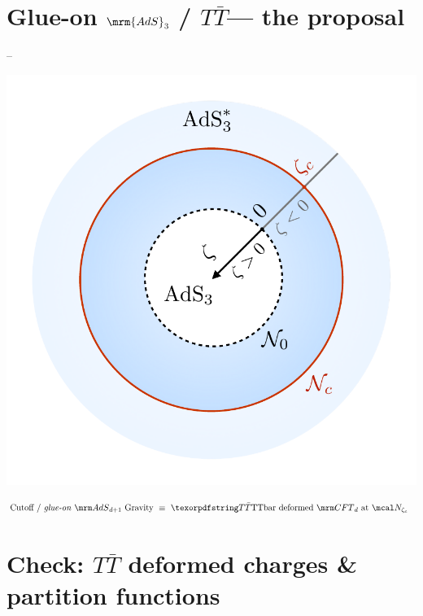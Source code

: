 \documentclass[10pt]{article}
\renewenvironment{frame}[1]%
	{\section*{#1}}%
	{\clearpage}
\newcommand{\TTbar}{\texorpdfstring{\ensuremath{T\bar{T}}}{TTbar}\xspace}
\begin{document}
\begin{frame}{Glue-on $\mrm{AdS}_3$ / \TTbar --- the proposal}{%
	\textcite{Apolo:2023vnm} -- 
}

\centering

\begin{minipage}{.5\textwidth}
\centering
\includegraphics[width=.9\linewidth]{img/diagram.pdf}
\end{minipage}

\begin{equation*}
\stateGlueon
\end{equation*}
\end{frame}

\section{\textbf{Check:} \TTbar deformed charges \& partition functions} \label{se:charges}
\end{document}
